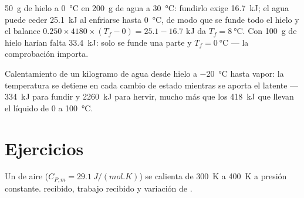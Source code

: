 \begin{example}\label{ex:b1:first-law:ice}
\qty{50}{g} de hielo a \qty{0}{\degreeCelsius} en \qty{200}{g} de agua a
\qty{30}{\degreeCelsius}: fundirlo exige \qty{16.7}{kJ}; el agua puede ceder
\qty{25.1}{kJ} al enfriarse hasta \qty{0}{\degreeCelsius}, de modo que se
funde todo el hielo y el balance $0.250 \times 4180 \times (T_f - 0) = 25.1 - 16.7$ kJ da
$T_f = \qty{8}{\degreeCelsius}$. Con \qty{100}{g} de hielo harían falta
\qty{33.4}{kJ}: solo se funde una parte y $T_f = \qty{0}{\degreeCelsius}$
--- la comprobación importa.
\end{example}

\begin{omfigure}

{\small Calentamiento de un kilogramo de agua desde hielo a
\qty{-20}{\degreeCelsius} hasta vapor: la temperatura se detiene en cada
cambio de estado mientras se aporta el  latente --- \qty{334}{kJ}
para fundir y \qty{2260}{kJ} para hervir, mucho más que los \qty{418}{kJ}
que llevan el líquido de \qty{0}{} a \qty{100}{\degreeCelsius}.}
\end{omfigure}

\section{Ejercicios}

\begin{exercise}[$\star$]\label{exo:b1:first-law:1}
Un  de aire ($C_{P,m} = \qty{29.1}{J/(mol.K)}$) se calienta de
\qty{300}{K} a \qty{400}{K} a presión constante.  recibido, trabajo
recibido y variación de .
\end{exercise}

